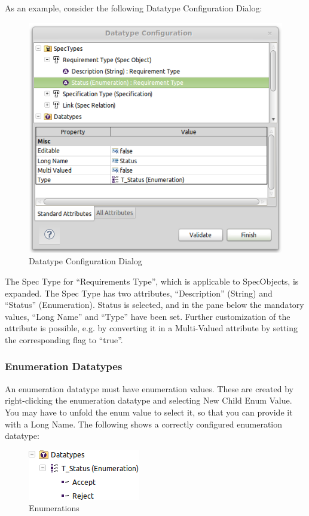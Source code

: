 As an example, consider the following Datatype Configuration Dialog:

\begin{figure}[h!]
\centering     
\includegraphics[width=0.8\linewidth]{../rmf-images/pror_datatype_configuration.png}
\caption{Datatype Configuration Dialog}      
\label{fig:DatatypeConfig}
\end{figure}

The Spec Type for ``Requirements Type'', which is applicable to
SpecObjects, is expanded.  The Spec Type has two attributes,
``Description'' (String) and ``Status'' (Enumeration).  Status is
selected, and in the pane below the mandatory values, ``Long Name'' and
``Type'' have been set.  Further customization of the attribute is
possible, e.g.  by converting it in a Multi-Valued attribute by setting
the corresponding flag to ``true''.

\subsubsection{Enumeration Datatypes}

An enumeration datatype must have enumeration values.  These are created
by right-clicking the enumeration datatype and selecting New Child
\textbar{} Enum Value.  You may have to unfold the enum value to select
it, so that you can provide it with a Long Name.  The following shows a
correctly configured enumeration datatype:

\begin{figure}[h!]
\centering      
\includegraphics[width=0.4\linewidth]{../rmf-images/rmf_enumeration.png}
\caption{Enumerations}      
\label{fig:Enumerations}
\end{figure}

